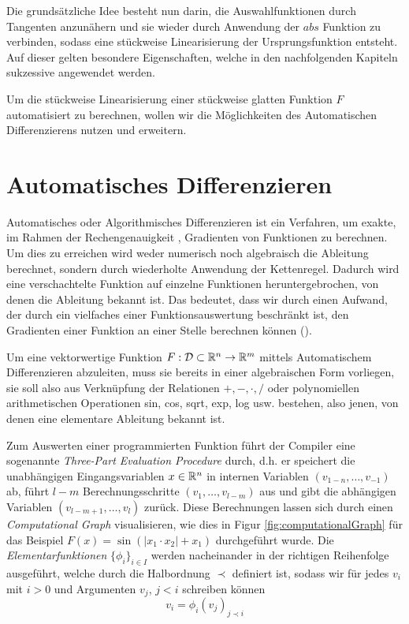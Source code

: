 Die grundsätzliche Idee besteht nun darin, die Auswahlfunktionen durch Tangenten anzunähern und sie wieder durch Anwendung der $abs$ Funktion zu verbinden, sodass eine stückweise Linearisierung der Ursprungsfunktion entsteht. Auf dieser gelten besondere Eigenschaften, welche in den nachfolgenden Kapiteln sukzessive angewendet werden.

Um die stückweise Linearisierung einer stückweise glatten Funktion $F$ automatisiert zu berechnen, wollen wir die Möglichkeiten des Automatischen Differenzierens nutzen und erweitern.

\section{Automatisches Differenzieren}
Automatisches oder Algorithmisches Differenzieren ist ein Verfahren, um exakte, im Rahmen der Rechengenauigkeit \cite[S.51]{griewank2008evaluating}, Gradienten von Funktionen zu berechnen. Um dies zu erreichen wird weder numerisch noch algebraisch die Ableitung berechnet, sondern durch wiederholte Anwendung der Kettenregel. Dadurch wird eine verschachtelte Funktion auf einzelne Funktionen heruntergebrochen, von denen die Ableitung bekannt ist. Das bedeutet, dass wir durch einen Aufwand, der durch ein vielfaches einer Funktionsauswertung beschränkt ist, den Gradienten einer Funktion an einer Stelle berechnen können (\cite[S. 43, S.83]{griewank2008evaluating}). 

Um eine vektorwertige Funktion $F:\mathcal D \subset \mathbb{R}^n\to \mathbb{R}^m$ mittels Automatischem Differenzieren abzuleiten, muss sie bereits in einer algebraischen Form vorliegen, sie soll also aus Verknüpfung der Relationen $+, -, \cdot, /$ oder polynomiellen arithmetischen Operationen sin, cos, sqrt, exp, log usw. bestehen, also jenen, von denen eine elementare Ableitung bekannt ist.  

Zum Auswerten einer programmierten Funktion führt der Compiler eine sogenannte \textit{Three-Part Evaluation Procedure} durch, d.h. er speichert die unabhängigen Eingangsvariablen $x\in \mathbb{R}^n$ in internen Variablen $(v_{1-n},\ldots,v_{-1})$ ab, führt $l-m$ Berechnungsschritte $(v_1,\ldots, v_{l-m})$ aus und gibt die abhängigen Variablen $(v_{l-m+1},\ldots,v_l)$ zurück. Diese Berechnungen lassen sich durch einen \textit{Computational Graph} visualisieren, wie dies in Figur \ref{fig:computationalGraph} für das Beispiel $F(x) = \sin(|x_1\cdot x_2|+x_1)$ durchgeführt wurde. 
Die \textit{Elementarfunktionen} $\lbrace \phi_i \rbrace_{i\in I}$ werden nacheinander in der richtigen Reihenfolge ausgeführt, welche durch die Halbordnung $\prec$ definiert ist, sodass wir für jedes $v_i$ mit $i>0$ und Argumenten $v_j$, $j<i$ schreiben können
\[
 v_i = \phi_i(v_j)_{j\prec i}
\]

